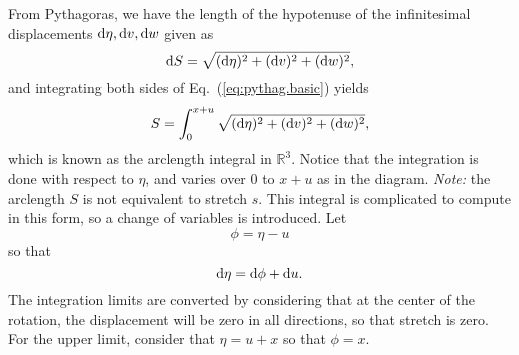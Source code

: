 \noindent From Pythagoras, we have the length of the hypotenuse of the infinitesimal displacements $\text d\eta, \text dv, \text dw$ given as
\begin{equation}
\text dS = \sqrt{(\text d\eta)^2+(\text dv)^2+(\text dw)^2},
\label{eq:pythag.basic}
\end{equation}
and integrating both sides of Eq.~(\ref{eq:pythag.basic}) yields
\begin{equation}
S = \int_0^{x+u} \sqrt{(\text d\eta)^2+(\text dv)^2+(\text dw)^2},
\label{eq:arclength.a}
\end{equation}
which is known as the arclength integral in $\mathbb R^3$. Notice that the integration is done with respect to $\eta$, and varies over 0 to $x+u$ as in the diagram. \emph{Note:} the arclength $S$ is not equivalent to stretch $s$. This integral is complicated to compute in this form, so a change of variables is introduced. Let
\begin{equation}
\phi = \eta - u
\end{equation}
so that
\begin{equation}
\text d\eta = \text d\phi + \text du.
\label{eq:pythag.subs.vars}
\end{equation}
The integration limits are converted by considering that at the center of the rotation, the displacement will be zero in all directions, so that stretch is zero. For the upper limit, consider that $\eta = u+x$ so that $\phi = x$. 

